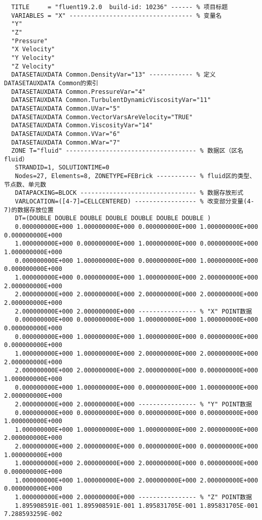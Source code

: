 \documentclass[lang=cn,11pt,a4paper]{elegantpaper}
\begin{document}
\begin{lstlisting}
  TITLE     = "fluent19.2.0  build-id: 10236" ------ % 项目标题
  VARIABLES = "X" ---------------------------------- % 变量名
  "Y"
  "Z"
  "Pressure"
  "X Velocity"
  "Y Velocity"
  "Z Velocity"
  DATASETAUXDATA Common.DensityVar="13" ------------ % 定义DATASETAUXDATA Common的索引
  DATASETAUXDATA Common.PressureVar="4"
  DATASETAUXDATA Common.TurbulentDynamicViscosityVar="11"
  DATASETAUXDATA Common.UVar="5"
  DATASETAUXDATA Common.VectorVarsAreVelocity="TRUE"
  DATASETAUXDATA Common.ViscosityVar="14"
  DATASETAUXDATA Common.VVar="6"
  DATASETAUXDATA Common.WVar="7"
  ZONE T="fluid" ------------------------------------ % 数据区（区名fluid）
   STRANDID=1, SOLUTIONTIME=0
   Nodes=27, Elements=8, ZONETYPE=FEBrick ----------- % fluid区的类型、节点数、单元数
   DATAPACKING=BLOCK -------------------------------- % 数据存放形式
   VARLOCATION=([4-7]=CELLCENTERED) ----------------- % 改变部分变量(4-7)的数据存放位置
   DT=(DOUBLE DOUBLE DOUBLE DOUBLE DOUBLE DOUBLE DOUBLE )
   0.000000000E+000 1.000000000E+000 0.000000000E+000 1.000000000E+000 0.000000000E+000
   1.000000000E+000 0.000000000E+000 1.000000000E+000 0.000000000E+000 1.000000000E+000
   0.000000000E+000 1.000000000E+000 0.000000000E+000 1.000000000E+000 0.000000000E+000
   1.000000000E+000 0.000000000E+000 1.000000000E+000 2.000000000E+000 2.000000000E+000
   2.000000000E+000 2.000000000E+000 2.000000000E+000 2.000000000E+000 2.000000000E+000
   2.000000000E+000 2.000000000E+000 ---------------- % "X" POINT数据
   0.000000000E+000 0.000000000E+000 1.000000000E+000 1.000000000E+000 0.000000000E+000
   0.000000000E+000 1.000000000E+000 1.000000000E+000 0.000000000E+000 0.000000000E+000
   1.000000000E+000 1.000000000E+000 2.000000000E+000 2.000000000E+000 2.000000000E+000
   2.000000000E+000 2.000000000E+000 2.000000000E+000 0.000000000E+000 1.000000000E+000
   0.000000000E+000 1.000000000E+000 0.000000000E+000 1.000000000E+000 2.000000000E+000
   2.000000000E+000 2.000000000E+000 ---------------- % "Y" POINT数据
   0.000000000E+000 0.000000000E+000 0.000000000E+000 0.000000000E+000 1.000000000E+000
   1.000000000E+000 1.000000000E+000 1.000000000E+000 2.000000000E+000 2.000000000E+000
   2.000000000E+000 2.000000000E+000 0.000000000E+000 0.000000000E+000 1.000000000E+000
   1.000000000E+000 2.000000000E+000 2.000000000E+000 0.000000000E+000 0.000000000E+000
   1.000000000E+000 1.000000000E+000 2.000000000E+000 2.000000000E+000 0.000000000E+000
   1.000000000E+000 2.000000000E+000 ---------------- % "Z" POINT数据
   1.895908591E-001 1.895908591E-001 1.895831705E-001 1.895831705E-001 7.288593259E-002

\end{lstlisting}
\end{document}
